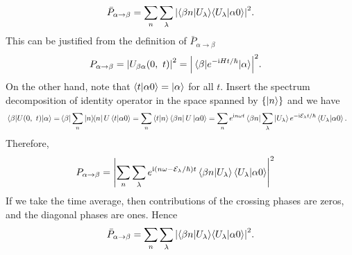 \documentclass{article}
\newcommand{\iu}{\ensuremath{\mathrm{i}}}
\newcommand{\set}[1]{\ensuremath{\left\{{#1}\right\}}}
\begin{document}
\begin{enumerate}[1.]
\begin{enumerate}[(i)]
\begin{align*}
      \bar{P}_{\alpha\to\beta} = \sum_{n}\sum_{\lambda} \abs{ {\ip{\beta n}{U_{\lambda}}}{\ip{U_{\lambda}}{\alpha 0}}}^2.
    \end{align*}
    This can be justified from the definition of $\bar{P}_{\alpha\to\beta}$
    \begin{align*}
      {P}_{\alpha\to\beta} &= \abs{U_{\beta\alpha}(0,\ t)}^2 = \abs{\mel{\beta}{e^{-\iu H t/\hbar}}{\alpha}}^2.
    \end{align*}
    On the other hand, note that $\bra{t}\ket{\alpha 0} = \ket{\alpha}$ for all $t$. Insert the spectrum decomposition of identity operator in the space spanned by $\set{\ket{n}}$ and we have
    \begin{align*}
      \mel{\beta}{U(0,\ t)}{\alpha} 
      =& \bra{\beta}\sum_{n}\op{n} U \bra{t}\ket{\alpha 0}
      =  \sum_{n} \ip{t}{n} \bra{\beta n} U\ket{\alpha 0}
      = \sum_{n} e^{\iu n\omega t} \bra{\beta n} \sum_\lambda\ket{U_\lambda}e^{-\iu\mathcal{E}_\lambda t/\hbar}\bra{U_\lambda} \ket{\alpha 0}.
    \end{align*}
    Therefore,
    \begin{align*}
      {P}_{\alpha\to\beta} &= \abs{\sum_{n}\sum_\lambda e^{\iu (n\omega - \mathcal{E}_\lambda/\hbar)t} \bra{\beta n}\ket{U_\lambda}\bra{U_\lambda} \ket{\alpha 0}}^2
    \end{align*}
    If we take the time average, then contributions of the crossing phases are zeros, and the diagonal phases are ones. Hence
    \begin{align*}
      \bar{P}_{\alpha\to\beta} = \sum_{n}\sum_{\lambda} \abs{ {\ip{\beta n}{U_{\lambda}}}{\ip{U_{\lambda}}{\alpha 0}}}^2.
    \end{align*}


\end{enumerate}
\end{enumerate}
\end{document}
